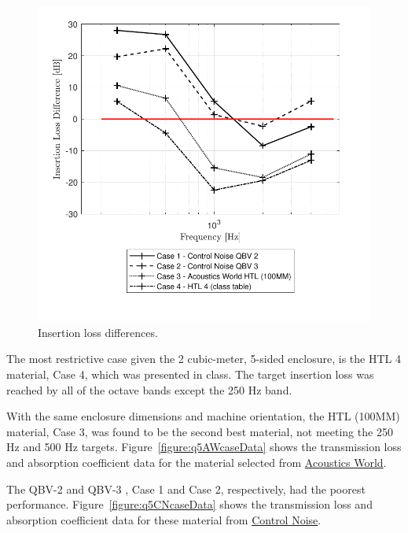 {{\vspace{-0.5cm}
\begin{figure}[htbp]
    \center
    \includegraphics[scale=0.8]{Q5 IL Plot.pdf}
    \vspace{-0.5cm}
    \caption{Insertion loss differences.}
    \label{figure:q5ilPlot}
\end{figure}

The most restrictive case given the 2 cubic-meter, 5-sided enclosure, is the HTL 4 material, Case 4, which was presented in class.  The target insertion loss was reached by all of the octave bands except the 250 Hz band.

\vspace{0.25cm}
With the same enclosure dimensions and machine orientation, the HTL (100MM) material, Case 3, was found to be the second best material, not meeting the 250 Hz and 500 Hz targets. Figure~\ref{figure:q5AWcaseData} shows the transmission loss and absorption coefficient data for the material selected from \href{https://www.acousticsworld.com/machine-acoustic-enclosures/}{Acoustics World}.

\vspace{0.25cm}
The QBV-2 and QBV-3 , Case 1 and Case 2, respectively, had the poorest performance.  
Figure~\ref{figure:q5CNcaseData} shows the transmission loss and absorption coefficient data for these material from 
\href{https://www.controlnoise.com/wp-content/uploads/2022/02/Acoustic-Enclosures-Datasheet.pdf}{Control Noise}.

}}
